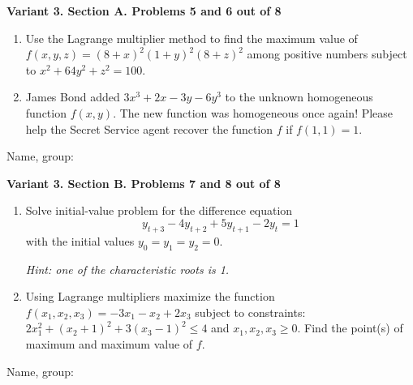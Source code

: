 \documentclass[12pt,a4paper]{article}
\begin{document}
\newpage
\textbf{Variant 3. Section A. Problems 5 and 6 out of 8}

\begin{enumerate}[resume]
\item Use the Lagrange multiplier method to find the maximum value of $f(x,y,z)=(8+x)^2(1+y)^2(8+z)^2$ among positive numbers subject to $x^2 + 64y^2 + z^2 = 100$.

\item James Bond added $3x^3+2x-3y - 6y^3$ to the unknown homogeneous function $f(x, y)$. The new function was homogeneous once again! Please help the Secret Service agent recover the function $f$ if $f(1, 1)=1$.

\end{enumerate}


\begin{framed}
\begin{minipage}{42em}
Name, group:\vspace*{3ex}\par
\noindent\dotfill
\end{minipage}
\end{framed}

\newpage
\textbf{Variant 3. Section B. Problems 7 and 8 out of 8}

\begin{enumerate}[resume]

\item Solve initial-value problem for the difference equation
\[
y_{t+3} -4y_{t+2} +5y_{t+1} -2y_{t} =1
\]
with the initial values $y_{0} =y_{1} =y_{2} =0$.

\textit{Hint: one of the characteristic roots is 1.}

\item Using Lagrange multipliers maximize the function $f(x_1,x_2,x_3)=-3x_1-x_2+2x_3$ subject to constraints:   $2x_1^2+(x_2+1)^2+3(x_3-1)^2\leq 4$ and $x_1, x_2, x_3 \geq 0$. Find the point(s) of maximum and maximum value of $f$.


\end{enumerate}


\begin{framed}
\begin{minipage}{42em}
Name, group:\vspace*{3ex}\par
\noindent\dotfill
\end{minipage}
\end{framed}

\end{document}
